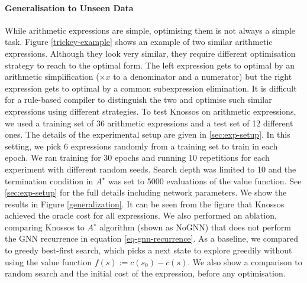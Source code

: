 \documentclass[fullpage,twocolumn]{article} %
\begin{document}
\paragraph{Generalisation to Unseen Data}
While arithmetic expressions are simple, optimising them is not always a simple task.
Figure \ref{trickey-example} shows an example of two similar arithmetic expressions.
Although they look very similar, they require different optimisation strategy to reach to the optimal form. The left expression gets to optimal by an arithmetic simplification ($\times x$ to a denominator and a numerator) but the right expression gets to optimal by a common subexpression elimination. It is difficult for a rule-based compiler to distinguish the two and optimise such similar expressions using different strategies.
To test Knossos on arithmetic expressions, we used a training set of 36 arithmetic expressions and a test set of 12 different ones. The details of the experimental setup are given in \ref{sec:exp-setup}. 
In this setting, we pick 6 expressions randomly from a training set to train in each epoch. We ran training for 30 epochs and running 10 repetitions for each experiment with different random seeds.
%
Search depth was limited to 10 and the termination condition in $A^\star$ was set to 5000 evaluations of the value function. See \ref{sec:exp-setup} for the full details including network parameters. We show the results in Figure \ref{generalization}. It can be seen from the figure that Knossos achieved the oracle cost for all expressions. We also performed an ablation, comparing Knossos to $A^\star$ algorithm (shown as NoGNN) that does not perform the GNN recurrence in equation \ref{eq-gnn-recurrence}. As a baseline, we compared to greedy best-first search, which picks a next state to explore greedily without using the value function $f(s) := c(s_0) - c(s)$. We also show a comparison to random search and the initial cost of the expression, before any optimisation.



\end{document}
